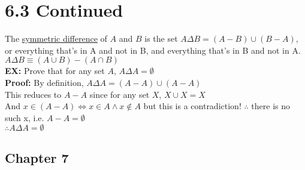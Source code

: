\documentclass{article}
\begin{document}
 		\section[04/10/18]{6.3 Continued}
 		The \underline{symmetric difference} of $A$ and $B$ is the set $A\Delta B=(A-B)\cup (B-A)$, or everything that's in A and not in B, and everything that's in B and not in A.\\
 		$A\Delta B\equiv (A\cup B)-(A\cap B)$\\
 		\textbf{EX:} Prove that for any set $A$, $A\Delta A=\emptyset$\\
 		\textbf{Proof:} By definition, $A\Delta A = (A-A)\cup(A-A)$\\
 		This reduces to $A-A$ since for any set $X$, $X\cup X = X$\\
 		And $x\in (A-A)\iff x\in A\land x\notin A$ but this is a contradiction! $\therefore$ there is no such x, i.e. $A-A=\emptyset$\\
 		$\therefore A\Delta A = \emptyset$
 		\subsection{Chapter 7}
\end{document}
